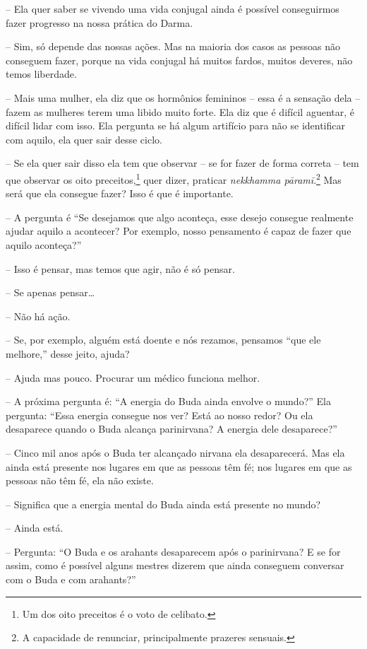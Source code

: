 -- Ela quer saber se vivendo uma vida conjugal ainda é possível
conseguirmos fazer progresso na nossa prática do Darma.

-- Sim, só depende das nossas ações. Mas na maioria dos casos as
pessoas não conseguem fazer, porque na vida conjugal há muitos fardos,
muitos deveres, não temos liberdade.

-- Mais uma mulher, ela diz que os hormônios femininos – essa é a
sensação dela – fazem as mulheres terem uma libido muito forte. Ela diz
que é difícil aguentar, é difícil lidar com isso. Ela pergunta se há
algum artifício para não se identificar com aquilo, ela quer sair desse
ciclo.

-- Se ela quer sair disso ela tem que observar – se for fazer de
forma correta – tem que observar os oito preceitos,\footnote{Um dos oito
preceitos é o voto de celibato.} quer dizer, praticar
\textit{nekkhamma pāramī}.\footnote{A capacidade de renunciar,
principalmente prazeres sensuais.} Mas será que ela consegue fazer?
Isso é que é importante.

-- A pergunta é “Se desejamos que algo aconteça, esse desejo
consegue realmente ajudar aquilo a acontecer? Por exemplo, nosso
pensamento é capaz de fazer que aquilo aconteça?”

-- Isso é pensar, mas temos que agir, não é só pensar.

-- Se apenas pensar…

-- Não há ação.

-- Se, por exemplo, alguém está doente e nós rezamos, pensamos “que
ele melhore,” desse jeito, ajuda?

-- Ajuda mas pouco. Procurar um médico funciona melhor.

-- A próxima pergunta é: “A energia do Buda ainda envolve o mundo?”
Ela pergunta: “Essa energia consegue nos ver? Está ao nosso redor? Ou
ela desaparece quando o Buda alcança parinirvana? A energia dele
desaparece?”

-- Cinco mil anos após o Buda ter alcançado nirvana ela
desaparecerá. Mas ela ainda está presente nos lugares em que as pessoas
têm fé; nos lugares em que as pessoas não têm fé, ela não existe.

-- Significa que a energia mental do Buda ainda está presente no
mundo?

-- Ainda está.

-- Pergunta: “O Buda e os arahants desaparecem após o parinirvana?
E se for assim, como é possível alguns mestres dizerem que ainda
conseguem conversar com o Buda e com arahants?”

